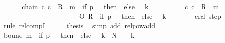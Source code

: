\begin{isabellebody}
\isanewline
\ \ \isamarkupfalse%
\isanewline
\ \ \isamarkupfalse%
\ chain{\isacharcolon}{\kern0pt}\ {\isachardoublequoteopen}{\isacharparenleft}{\kern0pt}c{}{\isacharcomma}{\kern0pt}\ c{}{\isacharparenright}{\kern0pt}\ {\isasymin}\ R{\isacharprime}{\kern0pt}\ {\isacharcircum}{\kern0pt}{\isacharcircum}{\kern0pt}\ {\isacharparenleft}{\kern0pt}m{}\ {\isacharplus}{\kern0pt}\ {\isacharparenleft}{\kern0pt}if\ {\isacharquery}{\kern0pt}p\ {\isacharequal}{\kern0pt}\ {}\ then\ {}\ else\ {}\ {\isacharasterisk}{\kern0pt}\ {\isacharquery}{\kern0pt}k{\isacharparenright}{\kern0pt}{\isacharparenright}{\kern0pt}{\isachardoublequoteclose}\isanewline
\ \ \isamarkupfalse%
\ {\isacharminus}{\kern0pt}\isanewline
\ \ \ \ \isamarkupfalse%
\ {\isachardoublequoteopen}{\isacharparenleft}{\kern0pt}c{}{\isacharcomma}{\kern0pt}\ c{}{\isacharparenright}{\kern0pt}\ {\isasymin}\ R{\isacharprime}{\kern0pt}\ {\isacharcircum}{\kern0pt}{\isacharcircum}{\kern0pt}\ m{}\isanewline
\ \ \ \ \ \ \ \ \ \ \ \ \ \ \ \ \ \ \ \ \ \ \ O\ R{\isacharprime}{\kern0pt}\ {\isacharcircum}{\kern0pt}{\isacharcircum}{\kern0pt}\ {\isacharparenleft}{\kern0pt}if\ {\isacharquery}{\kern0pt}p\ {\isacharequal}{\kern0pt}\ {}\ then\ {}\ else\ {}\ {\isacharasterisk}{\kern0pt}\ {\isacharquery}{\kern0pt}k{\isacharparenright}{\kern0pt}{\isachardoublequoteclose}\isanewline
\ \ \ \ \ \ \isamarkupfalse%
\ c{}{\isacharunderscore}{\kern0pt}rel\ step\ \isamarkupfalse%
\ {\isacharparenleft}{\kern0pt}rule\ relcompI{\isacharparenright}{\kern0pt}\isanewline
\ \ \ \ \isamarkupfalse%
\ {\isacharquery}{\kern0pt}thesis\ \isamarkupfalse%
\ {\isacharparenleft}{\kern0pt}simp\ add{\isacharcolon}{\kern0pt}\ relpow{\isacharunderscore}{\kern0pt}add{\isacharparenright}{\kern0pt}\isanewline
\ \ \isamarkupfalse%
\isanewline
\ \ \isamarkupfalse%
\ bound{\isacharcolon}{\kern0pt}\ {\isachardoublequoteopen}m{}\ {\isacharplus}{\kern0pt}\ {\isacharparenleft}{\kern0pt}if\ {\isacharquery}{\kern0pt}p\ {\isacharequal}{\kern0pt}\ {}\ then\ {}\ else\ {}\ {\isacharasterisk}{\kern0pt}\ {\isacharquery}{\kern0pt}k{\isacharparenright}{\kern0pt}\ {\isasymle}\ {\isacharquery}{\kern0pt}N\ {\isacharasterisk}{\kern0pt}\ {\isacharparenleft}{\kern0pt}{}\ {\isacharasterisk}{\kern0pt}\ {\isacharquery}{\kern0pt}k{\isacharparenright}{\kern0pt}{\isachardoublequoteclose}\isanewline

\end{isabellebody}
